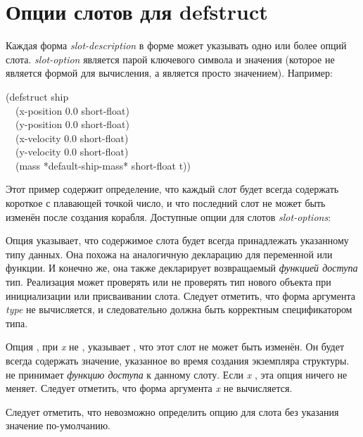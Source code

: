 \section{Опции слотов для defstruct}
\label{Defstruct-Slot-Options}

Каждая форма \emph{slot-description} в форме  может указывать
одно или более опций слота. \emph{slot-option} является парой ключевого символа и
значения (которое не является формой для вычисления, а является просто
значением).
Например:
\begin{lisp}
(defstruct ship \\
~~(x-position 0.0  short-float) \\
~~(y-position 0.0  short-float) \\
~~(x-velocity 0.0  short-float) \\
~~(y-velocity 0.0  short-float) \\
~~(mass *default-ship-mass*  short-float  t))
\end{lisp}
Этот пример содержит определение, что каждый слот будет всегда содержать
короткое с плавающей точкой число, и что последний слот не может быть изменён
после создания корабля.
Доступные опции для слотов \emph{slot-options}:
\begin{flushdesc}
\item[\cd{:type}]
Опция  указывает, что содержимое слота будет всегда
принадлежать указанному типу данных. Она похожа на аналогичную декларацию для
переменной или функции. И конечно же, она также декларирует возвращаемый
\emph{функцией доступа} тип. Реализация может проверять или не проверять тип
нового объекта при инициализации или присваивании слота.
Следует отметить, что форма аргумента \emph{type} не вычисляется, и
следовательно должна быть корректным спецификатором типа.

\item[\cd{:read-only}]
Опция , при \emph{x} не {\false}, указывает , что
этот слот не может быть изменён. Он будет всегда содержать значение, указанное
во время создания экземпляра структуры.
 не принимает \emph{функцию доступа} к данному слоту.
Если \emph{x} {\false}, эта опция ничего не меняет.
Следует отметить, что форма аргумента \emph{x} не вычисляется.
\end{flushdesc}

Следует отметить, что невозможно определить опцию для слота без указания
значение по-умолчанию.

